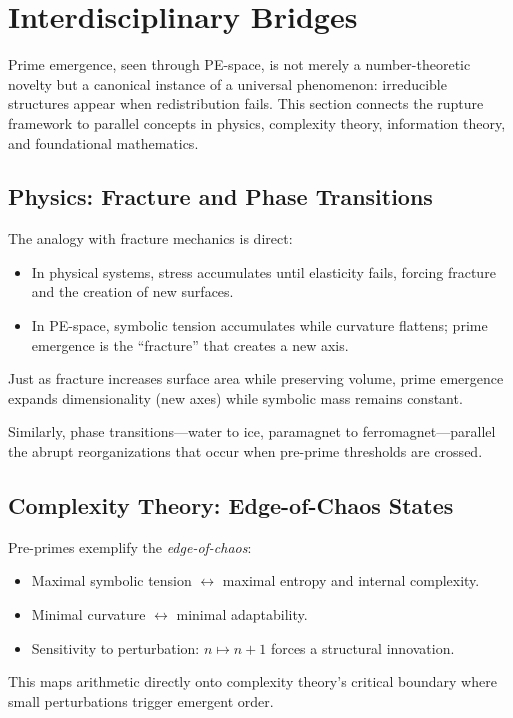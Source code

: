 \documentclass[11pt]{article}
\theoremstyle{plain}
\theoremstyle{definition}
\begin{document}
\section{Interdisciplinary Bridges}

Prime emergence, seen through PE-space, is not merely a number-theoretic novelty but a canonical instance of a universal phenomenon: irreducible structures appear when redistribution fails. This section connects the rupture framework to parallel concepts in physics, complexity theory, information theory, and foundational mathematics.

\subsection{Physics: Fracture and Phase Transitions}
The analogy with fracture mechanics is direct:
\begin{itemize}
  \item In physical systems, stress accumulates until elasticity fails, forcing fracture and the creation of new surfaces.  
  \item In PE-space, symbolic tension accumulates while curvature flattens; prime emergence is the “fracture” that creates a new axis.  
\end{itemize}
Just as fracture increases surface area while preserving volume, prime emergence expands dimensionality (new axes) while symbolic mass remains constant.  

Similarly, phase transitions—water to ice, paramagnet to ferromagnet—parallel the abrupt reorganizations that occur when pre-prime thresholds are crossed.

\subsection{Complexity Theory: Edge-of-Chaos States}
Pre-primes exemplify the \emph{edge-of-chaos}:
\begin{itemize}
  \item Maximal symbolic tension $\leftrightarrow$ maximal entropy and internal complexity.  
  \item Minimal curvature $\leftrightarrow$ minimal adaptability.  
  \item Sensitivity to perturbation: $n \mapsto n+1$ forces a structural innovation.  
\end{itemize}
This maps arithmetic directly onto complexity theory’s critical boundary where small perturbations trigger emergent order.
\end{document}
